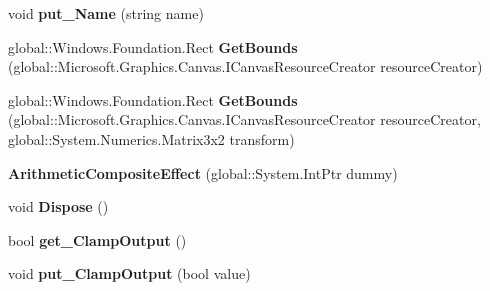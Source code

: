 \begin{DoxyCompactItemize}
void {\bfseries put\+\_\+\+Name} (string name)
\item 
\mbox{\label{class_microsoft_1_1_graphics_1_1_canvas_1_1_effects_1_1_arithmetic_composite_effect_a424c1b1e1b879fc96a6293eb16416937}} 
global\+::\+Windows.\+Foundation.\+Rect {\bfseries Get\+Bounds} (global\+::\+Microsoft.\+Graphics.\+Canvas.\+I\+Canvas\+Resource\+Creator resource\+Creator)
\item 
\mbox{\label{class_microsoft_1_1_graphics_1_1_canvas_1_1_effects_1_1_arithmetic_composite_effect_ae11051d53e88d2ea9c48b02a05449c08}} 
global\+::\+Windows.\+Foundation.\+Rect {\bfseries Get\+Bounds} (global\+::\+Microsoft.\+Graphics.\+Canvas.\+I\+Canvas\+Resource\+Creator resource\+Creator, global\+::\+System.\+Numerics.\+Matrix3x2 transform)
\item 
\mbox{\label{class_microsoft_1_1_graphics_1_1_canvas_1_1_effects_1_1_arithmetic_composite_effect_a0b741230609e3e96b63205529cafcc0e}} 
{\bfseries Arithmetic\+Composite\+Effect} (global\+::\+System.\+Int\+Ptr dummy)
\item 
\mbox{\label{class_microsoft_1_1_graphics_1_1_canvas_1_1_effects_1_1_arithmetic_composite_effect_a814a3083301ae2542741410c5216199c}} 
void {\bfseries Dispose} ()
\item 
\mbox{\label{class_microsoft_1_1_graphics_1_1_canvas_1_1_effects_1_1_arithmetic_composite_effect_ad7af239149182a318b8d1401cde7cdf1}} 
bool {\bfseries get\+\_\+\+Clamp\+Output} ()
\item 
\mbox{\label{class_microsoft_1_1_graphics_1_1_canvas_1_1_effects_1_1_arithmetic_composite_effect_ac9e62a63352048c2ea53d659c3251f7f}} 
void {\bfseries put\+\_\+\+Clamp\+Output} (bool value)
\item 
\mbox{\label{class_microsoft_1_1_graphics_1_1_canvas_1_1_effects_1_1_arithmetic_composite_effect_abe3d457ef2dfc078a7533da0cd1642f0}} 

\end{DoxyCompactItemize}
